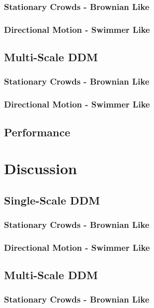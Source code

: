 \documentclass[11pt]{article}
\begin{document}
\subsubsection{Stationary Crowds - Brownian Like}

\subsubsection{Directional Motion - Swimmer Like}

\subsection{Multi-Scale DDM}
\subsubsection{Stationary Crowds - Brownian Like}

\subsubsection{Directional Motion - Swimmer Like}

\subsection{Performance}


\section{Discussion}
\label{section:discussion}
\subsection{Single-Scale DDM}
\subsubsection{Stationary Crowds - Brownian Like}

\subsubsection{Directional Motion - Swimmer Like}

\subsection{Multi-Scale DDM}
\subsubsection{Stationary Crowds - Brownian Like}
\end{document}
